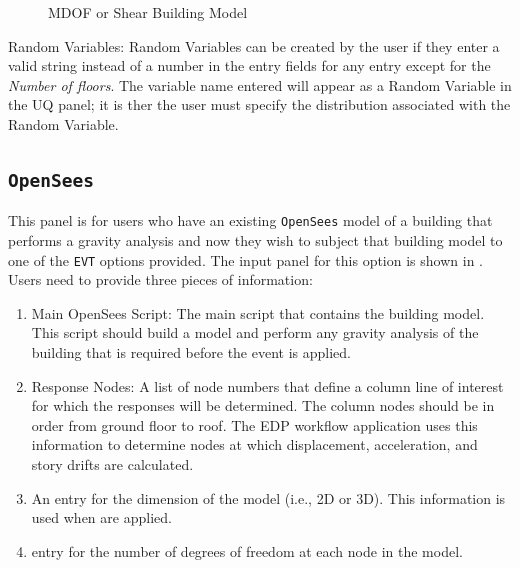 \begin{figure}[!htbp]
  \caption{MDOF or Shear Building Model}
  \label{fig:mdof}
\end{figure}

Random Variables: Random Variables can be created by the user if they enter
a valid string instead of a number in the entry fields for any entry
except for the \emph{Number of floors}. The variable name entered will appear as
a Random Variable in the UQ panel; it is ther the user must specify the distribution 
associated with the Random Variable.

\subsection{\texttt{OpenSees}}\label{sec:OpenSeesSIM}
This panel is for users who have an existing \texttt{OpenSees} model of a
building that performs a gravity analysis and now they wish to subject that
building model to one of the \texttt{EVT} options provided. The input panel
for this option is shown in . Users need to provide three pieces of information:
\begin{enumerate} 
\item Main OpenSees Script: The main script that contains the building
  model. This script should build a model and perform any gravity
  analysis of the building that is required before the event is
  applied.
\item Response Nodes: A list of node numbers that define a column line of interest for which
  the responses will be determined. The column nodes should be in
  order from ground floor to roof. 
  The EDP workflow application uses this information to determine nodes at which
  displacement, acceleration, and story drifts are calculated.
\item An entry for the dimension of the model (i.e., 2D or 3D). This
  information is used when  are applied.
\item entry for the number of degrees of freedom at each node in the model.
\end{enumerate}

